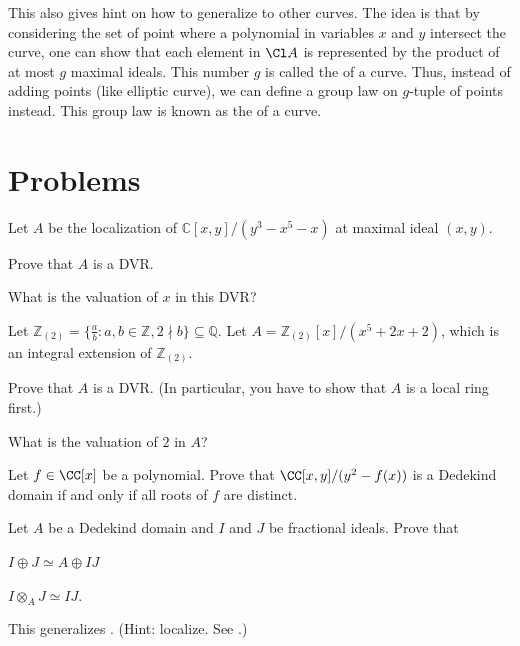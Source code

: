 This also gives hint on how to generalize to other curves.
The idea is that by considering the set of point 
where a polynomial in variables $x$ and $y$ intersect the curve,
one can show that each element in $\Cl A$
is represented by the product of at most $g$ maximal ideals.
This number $g$ is called the  of a curve.
Thus, instead of adding points (like elliptic curve),
we can define a group law on $g$-tuple of points instead.
This group law is known as the  of a curve.
%
%
\section{Problems}
\begin{problem}
Let $A$ be the localization of $\mathbb C[x,y]/(y^3-x^5-x)$ at maximal ideal $(x,y)$.
\begin{alphenum}
\item Prove that $A$ is a DVR.
\item What is the valuation of $x$ in this DVR?
\end{alphenum}
\end{problem}
\begin{problem}
Let $\mathbb Z_{(2)} = \{\tfrac ab : a,b\in\mathbb Z, 2\nmid b\}\subseteq \mathbb Q$. Let $A=\mathbb Z_{(2)}[x]/(x^5+2x+2)$, which is an integral extension of $\mathbb Z_{(2)}$.
\begin{alphenum}
\item Prove that $A$ is a DVR. 
(In particular, you have to show that $A$ is a local ring first.)
\item What is the valuation of $2$ in $A$?
\end{alphenum}
\end{problem}
\begin{problem}
\label{prob:hyperelliptic_dedekind}
Let $f\in\CC[x]$ be a polynomial.
Prove that $\CC[x,y]/(y^2-f(x))$ is a Dedekind domain 
if and only if all roots of $f$ are distinct.
\end{problem}
\begin{problem}
\label{prob:dedekind_ideal}
Let $A$ be a Dedekind domain and $I$ and $J$ be fractional ideals.
Prove that 
\begin{alphenum}
\item $I\oplus J \simeq A\oplus IJ$
\item $I\otimes_A J \simeq IJ$.
\end{alphenum}
This generalizes . 
(Hint: localize. See .)
\end{problem}
